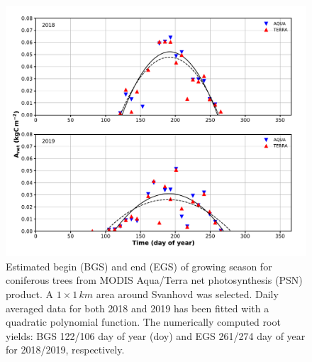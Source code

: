 \documentclass[bg, manuscript]{copernicus}
\begin{document}
\begin{figure}[t]
  \includegraphics[width=12cm]{figB1}
  \caption{Estimated begin (BGS) and end (EGS) of growing season for coniferous trees from MODIS Aqua/Terra net photosynthesis (PSN) product. A $1\times 1\,\unit{km}$ area around Svanhovd was selected. Daily averaged data for both 2018 and 2019 has been fitted with a quadratic polynomial function. The numerically computed root yields: BGS 122/106 day of year (\unit{doy}) and EGS 261/274 day of year for 2018/2019, respectively.}
  \label{fig:modis_Psn}
\end{figure}
\end{document}
